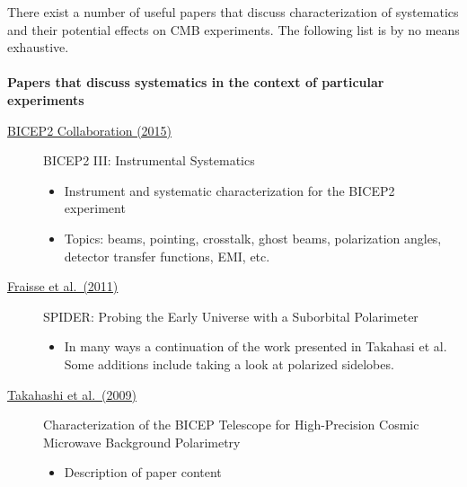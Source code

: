 There exist a number of useful papers that discuss characterization of systematics and their potential effects on CMB experiments. The following list is by no means exhaustive.
\\ \\
\textbf{Papers that discuss systematics in the context of particular experiments}
\begin{description}

\item[\href{https://arxiv.org/abs/1502.00608}{BICEP2 Collaboration (2015)}] BICEP2 III: Instrumental Systematics
\begin{itemize}[noitemsep]
\item Instrument and systematic characterization for the BICEP2 experiment
\item Topics: beams, pointing, crosstalk, ghost beams, polarization angles, detector transfer functions, EMI, etc.
\end{itemize}

\item[\href{https://arxiv.org/abs/1106.3087}{Fraisse et al.\ (2011)}] SPIDER: Probing the Early Universe with a Suborbital Polarimeter
\begin{itemize}[noitemsep]
\item In many ways a continuation of the work presented in Takahasi et al. Some additions include taking a look at polarized sidelobes.
\end{itemize}

\item[\href{https://arxiv.org/abs/0906.4069}{Takahashi et al.\ (2009)}] Characterization of the BICEP Telescope for High-Precision Cosmic Microwave Background Polarimetry
\begin{itemize}[noitemsep]
\item Description of paper content
\end{itemize}


\end{description}

